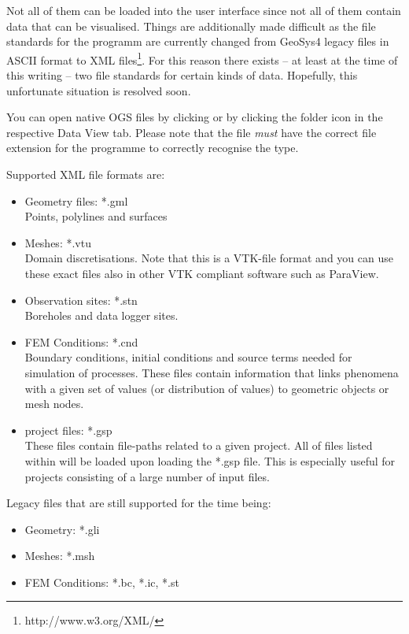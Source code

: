 Not all of them can be loaded into the user interface since not all of them contain data that can be visualised. Things are additionally made difficult as the file standards for the programm are currently changed from GeoSys4 legacy files in ASCII format to XML files\footnote{http://www.w3.org/XML/}. For this reason there exists -- at least at the time of this writing -- two file standards for certain kinds of data. Hopefully, this unfortunate situation is resolved soon.

You can open native OGS files by clicking  or by clicking the folder icon in the respective Data View tab. Please note that the file \emph{must} have the correct file extension for the programme to correctly recognise the type.

Supported XML file formats are:
\begin{itemize}
\item Geometry files: *.gml\\
        Points, polylines and surfaces
\item Meshes: *.vtu\\
        Domain discretisations. Note that this is a VTK-file format and you can use these exact files also in other VTK compliant software such as ParaView.
\item Observation sites: *.stn\\
        Boreholes and data logger sites.
\item FEM Conditions: *.cnd\\
        Boundary conditions, initial conditions and source terms needed for simulation of processes. These files contain information that links phenomena with a given set of values (or distribution of values) to geometric objects or mesh nodes.
\item \ogs project files: *.gsp\\
    These files contain file-paths related to a given project. All of files listed within will be loaded upon loading the *.gsp file. This is especially useful for projects consisting of a large number of input files.
\end{itemize}

Legacy files that are still supported for the time being:
\begin{itemize}
\item Geometry: *.gli
\item Meshes: *.msh
\item FEM Conditions: *.bc, *.ic, *.st
\end{itemize}



